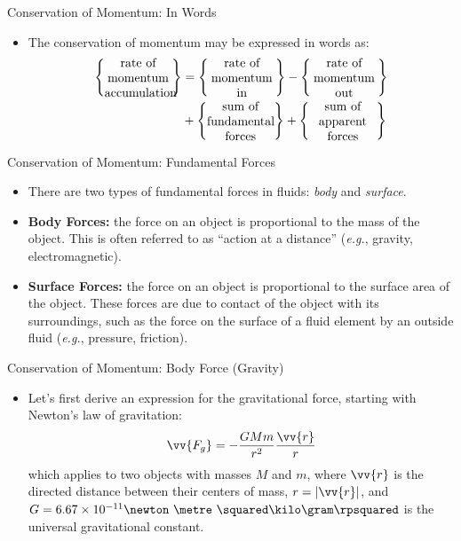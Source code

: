 \begin{frame}{Conservation of Momentum: In Words}
\begin{itemize}
	\item The conservation of momentum may be expressed in words as:
	\begin{align*}
	\left \{\parbox{5.4em}{\centering rate of\\ momentum\\accumulation}\right\} &= \left \{\parbox{5.4em}{\centering rate of\\momentum\\in}\right\} - \left \{\parbox{5.4em}{\centering rate of\\momentum\\out}\right\} \\&+ \left \{\parbox{5.4em}{\centering sum of\\fundamental\\forces}\right\} + \left \{\parbox{5.4em}{\centering sum of\\apparent\\forces}\right\}
	\end{align*}
\end{itemize}
\end{frame}
\begin{frame}{Conservation of Momentum: Fundamental Forces}
\begin{itemize}
	\item There are two types of fundamental forces in fluids: \textit{body} and \textit{surface}.
	\item \textbf{Body Forces:} the force on an object is proportional to the mass of
the object. This is often referred to as ``action at a distance'' (\textit{e.g.}, gravity, electromagnetic).
	\item \textbf{Surface Forces:} the force on an object is proportional to the surface area of the object. These forces are due to contact of the object with its surroundings, such as the force on the surface of a fluid element by an outside fluid (\textit{e.g.}, pressure, friction).
\end{itemize}
\end{frame}
\begin{frame}{Conservation of Momentum: Body Force (Gravity)}
\begin{itemize}
	\item Let's first derive an expression for the gravitational force, starting with Newton's law of gravitation:
	$$\vv{F_g} = -\frac{GMm}{r^2}\frac{\vv{r}}{r}$$
	which applies to two objects with masses $M$ and $m$, where $\vv{r}$ is the directed distance between their centers of mass, $r=|\vv{r}|$, and $G=6.67\times 10^{-11} \newton\  \metre\ \squared \kilo\gram\rpsquared$ is the universal gravitational constant.
\end{itemize}
\end{frame}

